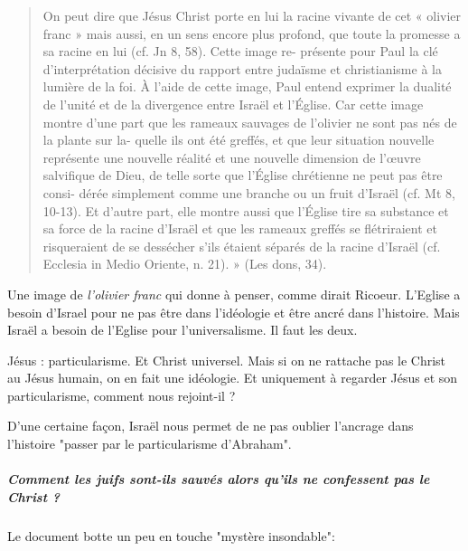     \begin{quote}
         On peut dire que Jésus Christ porte en lui la racine vivante de
cet « olivier franc » mais aussi, en un sens encore plus profond, que
toute la promesse a sa racine en lui (cf. Jn 8, 58). Cette image re-
présente pour Paul la clé d’interprétation décisive du rapport entre
judaïsme et christianisme à la lumière de la foi. À l’aide de cette
image, Paul entend exprimer la dualité de l’unité et de la divergence
entre Israël et l’Église. Car cette image montre d’une part que les
rameaux sauvages de l’olivier ne sont pas nés de la plante sur la-
quelle ils ont été greffés, et que leur situation nouvelle représente
une nouvelle réalité et une nouvelle dimension de l’œuvre salvifique
de Dieu, de telle sorte que l’Église chrétienne ne peut pas être consi-
dérée simplement comme une branche ou un fruit d’Israël (cf. Mt
8, 10-13). Et d’autre part, elle montre aussi que l’Église tire sa substance et sa force de la racine d’Israël et que les rameaux greffés se
flétriraient et risqueraient de se dessécher s’ils étaient séparés de la
racine d’Israël (cf. Ecclesia in Medio Oriente, n. 21). » (Les dons,
34).
    \end{quote}
    
    Une image de \textit{l'olivier franc} qui donne à penser, comme dirait Ricoeur. 
      L'Eglise a besoin d'Israel pour ne pas être dans l'idéologie et être ancré dans l'histoire. Mais Israël a besoin de l'Eglise pour l'universalisme.
      Il faut les deux.
      \begin{Synthesis}
      Jésus : particularisme. Et Christ universel. Mais si on ne rattache pas le Christ au Jésus humain, on en fait une idéologie. Et uniquement à regarder Jésus et son particularisme, comment nous rejoint-il ?
      \end{Synthesis}
      D'une certaine façon, Israël nous permet de ne pas oublier l'ancrage dans l'histoire "passer par le particularisme d'Abraham".
      
      
      \subparagraph{Comment les juifs sont-ils sauvés alors qu'ils ne confessent pas
      le Christ ?}
 Le document botte un peu en touche "mystère insondable": 
 
